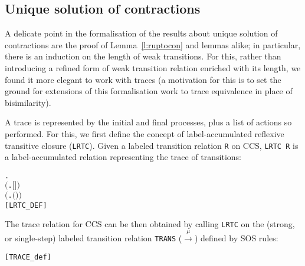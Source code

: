 \subsection{Unique solution of contractions}

A delicate point in the formalisation of the results about unique solution of
contractions are the proof of Lemma~\ref{l:ruptocon} and lemmas alike;
in particular, there is
 an induction on the length of weak transitions. 
For this, rather than 
 introducing a refined form of weak transition relation
enriched with its length, 
we found it more elegant  to  work with traces
(a motivation for this is to set the ground for extensions of this
formalisation work to trace equivalence in place of bisimilarity).



A trace is represented by the initial and final processes, plus
a list of actions  so performed.
For this, we first 
 define the concept of label-accumulated reflexive transitive closure
 (\texttt{LRTC}).
Given a labeled transition relation \texttt{R} on CCS, \texttt{LRTC R} is
a label-accumulated relation representing the trace of transitions:
\begin{alltt}
        \HOLTokenDefEquality{}
     \HOLSymConst{\HOLTokenForall{}}.
         \ensuremath{(}\HOLSymConst{\HOLTokenForall{}}.   \ensuremath{[}\ensuremath{]} \ensuremath{)} \HOLSymConst{\HOLTokenConj{}}
         \ensuremath{(}\HOLSymConst{\HOLTokenForall{}}    .     \HOLSymConst{\HOLTokenConj{}}     \HOLSymConst{\HOLTokenImp{}}   \ensuremath{(}\HOLSymConst{::}\ensuremath{)} \ensuremath{)} \HOLSymConst{\HOLTokenImp{}}
            \hfill{[LRTC_DEF]}
\end{alltt}
The trace relation for CCS can be then obtained
 by calling \texttt{LRTC} on the (strong, or single-step) labeled transition
 relation \texttt{TRANS} ($\overset{\mu}{\rightarrow}$) defined by SOS rules:
\begin{alltt}
    \HOLTokenDefEquality{}  \hfill{[TRACE_def]}
\end{alltt}

